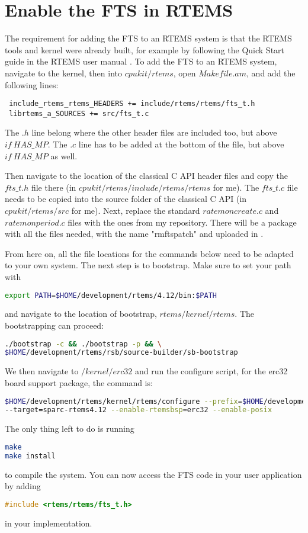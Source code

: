 \section{Enable the FTS in RTEMS}
The requirement for adding the FTS to an RTEMS system is that the RTEMS tools and kernel were already built, for example by following the Quick Start guide in the RTEMS user manual \cite{rtemsuser}.
To add the FTS to an RTEMS system, navigate to the kernel, then into $cpukit/rtems$, open $Makefile.am$, and add the following lines:
\begin{lstlisting}
 include_rtems_rtems_HEADERS += include/rtems/rtems/fts_t.h 
 librtems_a_SOURCES += src/fts_t.c
\end{lstlisting}
The $.h$ line belong where the other header files are included too, but above $if~HAS\_MP$. The $.c$ line has to be added at the bottom of the file, but above $if~HAS\_MP$ as well. 

Then navigate to the location of the classical C API header files and copy the $fts\_t.h$ file there (in $cpukit/rtems/include/rtems/rtems$ for me). The $fts\_t.c$ file needs to be copied into the source folder of the classical C API (in $cpukit/rtems/src$ for me). Next, replace the standard $ratemoncreate.c$ and $ratemonperiod.c$ files with the ones from my repository. There will be a package with all the files needed, with the name "rmftspatch" and uploaded in \cite{gitmyay}.

From here on, all the file locations for the commands below need to be adapted to your own system. The next step is to bootstrap. Make sure to set your path with
\begin{lstlisting}[language=bash]
export PATH=$HOME/development/rtems/4.12/bin:$PATH
\end{lstlisting}
and navigate to the location of bootstrap, $rtems/kernel/rtems$. The bootstrapping can proceed:
\begin{lstlisting}[language=bash]
./bootstrap -c && ./bootstrap -p && \
$HOME/development/rtems/rsb/source-builder/sb-bootstrap
\end{lstlisting}
We then navigate to $/kernel/erc32$ and run the configure script, for the erc32 board support package, the command is:
\begin{lstlisting}[language=bash]
$HOME/development/rtems/kernel/rtems/configure --prefix=$HOME/development/rtems/4.12 \
--target=sparc-rtems4.12 --enable-rtemsbsp=erc32 --enable-posix
\end{lstlisting}
The only thing left to do is running 
\begin{lstlisting}[language=bash]
make
make install
\end{lstlisting}
to compile the system. You can now access the FTS code in your user application by adding
\begin{lstlisting}[language=C]
#include <rtems/rtems/fts_t.h> 
\end{lstlisting}
in your implementation.